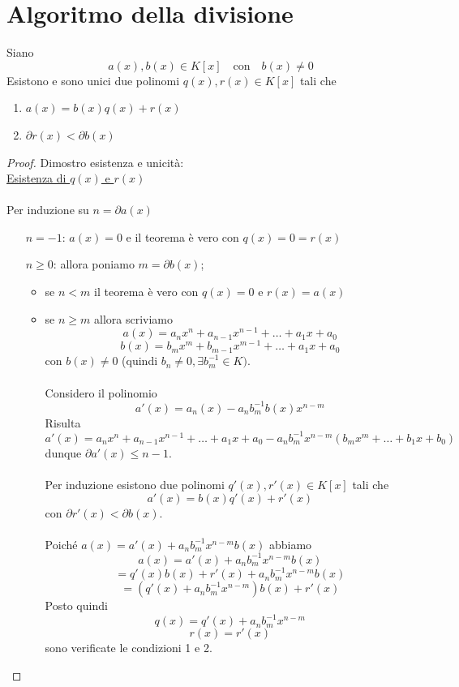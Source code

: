 \documentclass[a4paper,12pt, oneside]{book}
\begin{document}
	\section{Algoritmo della divisione}
		\begin{teorema}
			Siano $$a(x), b(x) \in K[x] \quad \mbox{con} \quad b(x) \not = 0$$
			Esistono e sono unici due polinomi $q(x), r(x) \in K[x]$ tali che
			\begin{enumerate}
				\item $a(x) = b(x)q(x)+r(x)$
				\item $\partial r(x) < \partial b(x)$
			\end{enumerate}
			
			\begin{proof} Dimostro esistenza e unicità:\\
				
				\underline{Esistenza di $q(x)$ e $r(x)$}\\\\
					Per induzione su $n = \partial a(x)$
					\begin{itemize}
						\item[$n = -1$:] $a(x)=0$ e il teorema è vero con $q(x) = 0 = r(x)$
						\item[$n \geq 0$:] allora poniamo $m = \partial b(x)$;
							\begin{itemize}
								\item se $n < m$ il teorema è vero con $q(x)=0$ e $r(x)=a(x)$
								\item se $n \geq m$ allora scriviamo
									$$a(x) = a_{n}x^{n} + a_{n-1}x^{n-1} + \dots + a_{1}x + a_{0}$$
									$$b(x) = b_{m}x^{m} + b_{m-1}x^{m-1} + \dots + a_{1}x + a_{0}$$
									con $b(x) \not = 0$ (quindi $b_n \not = 0, \exists b_m^{-1} \in K)$.\\\\
									Considero il polinomio
									$$a'(x) = a_n(x) - a_nb_m^{-1} b(x) x^{n-m}$$
									Risulta
									$$a'(x) = a_nx^n + a_{n-1}x^{n-1}+ \dots + a_1x+a_0 - a_nb_m^{-1}x^{n-m}(b_mx^m+\dots+b_1x+b_0)$$
									dunque $\partial a'(x) \leq n-1$.\\\\
									Per induzione esistono due polinomi $q'(x), r'(x) \in K[x]$ tali che
									$$a'(x) = b(x)q'(x) + r'(x)$$
									con $\partial r'(x) < \partial b(x)$.\\\\
									Poiché $a(x) = a'(x) + a_nb_m^{-1}x^{n-m}b(x)$ abbiamo
									$$a(x) = a'(x) + a_nb_m^{-1}x^{n-m}b(x)$$
									$$= q'(x)b(x)+r'(x) + a_nb_m^{-1}x^{n-m}b(x)$$
									$$= (q'(x) + a_nb_m^{-1}x^{n-m})b(x) +r'(x)$$
									Posto quindi
									$$q(x) = q'(x) + a_nb_m^{-1}x^{n-m} $$
									$$r(x) = r'(x)$$
									sono verificate le condizioni 1 e 2.\\
							\end{itemize}
					\end{itemize}
				

\end{proof}
\end{teorema}
\end{document}
